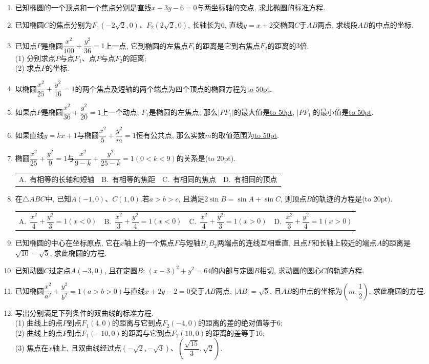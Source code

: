 \documentclass[10pt,a4paper]{article}
\newcommand{\blank}[1]{\underline{\hbox to #1pt{}}}
\newcommand{\bracket}[1]{(\hbox to #1pt{})}
\newcommand{\fourch}[4]{\par\begin{tabular}{p{.23\textwidth}p{.23\textwidth}p{.23\textwidth}p{.23\textwidth}}
A.~#1 &B.~#2& C.~#3& D.~#4
\end{tabular}}
\begin{document}
\begin{enumerate}[1.]
\item 已知椭圆的一个顶点和一个焦点分别是直线$x+3y-6=0$与两坐标轴的交点, 求此椭圆的标准方程.
\item 已知椭圆$C$的焦点分别为$F_1(-2\sqrt 2,0)$、$F_2(2\sqrt 2,0)$, 长轴长为$6$, 直线$y=x+2$交椭圆$C$于$AB$两点, 求线段$AB$的中点的坐标.
\item 已知点$P$是椭圆$\dfrac{x^2}{100}+\dfrac{y^2}{36}=1$上一点, 它到椭圆的左焦点$F_1$的距离是它到右焦点$F_2$的距离的$3$倍.\\
(1) 分别求点$P$与点$F_1$、点$P$与点$F_2$的距离;\\
(2) 求点$P$的坐标.
\item 以椭圆$\dfrac{x^2}{25}+\dfrac{y^2}{16}=1$的两个焦点及短轴的两个端点为四个顶点的椭圆方程为\blank{50}.
\item 如果点$P$是椭圆$\dfrac{x^2}{36}+\dfrac{y^2}{20}=1$上一个动点, $F_1$是椭圆的左焦点, 那么$|PF_1|$的最大值是\blank{50}, $|PF_1|$的最小值是\blank{50}.
\item 如果直线$y=kx+1$与椭圆$\dfrac{x^2}5+\dfrac{y^2}m=1$恒有公共点, 那么实数$m$的取值范围为\blank{50}.
\item 椭圆$\dfrac{x^2}{25}+\dfrac{y^2}9=1$与$\dfrac{x^2}{9-k}+\dfrac{y^2}{25-k}=1(0<k<9)$的关系是\bracket{20}.
\fourch{有相等的长轴和短轴}{有相等的焦距}{有相同的焦点}{有相同的顶点}
\item 在$\triangle ABC$中, 已知$A(-1,0)$、$C(1,0)$.若$a>b>c$, 且满足$2\sin B=\sin A+\sin C$, 则顶点$B$的轨迹的方程是\bracket{20}.
\fourch{$\dfrac{x^2}4+\dfrac{y^2}3=1(x<0)$}{$\dfrac{x^2}3+\dfrac{y^2}4=1(x<0)$}{$\dfrac{x^2}4+\dfrac{y^2}3=1(x>0)$}{$\dfrac{x^2}3+\dfrac{y^2}4=1(x>0)$}
\item 已知椭圆的中心在坐标原点, 它在$x$轴上的一个焦点$F$与短轴$B_1B_2$两端点的连线互相垂直, 且点$F$和长轴上较近的端点$A$的距离是$\sqrt {10}-\sqrt 5$, 求此椭圆的方程.
\item 已知动圆$C$过定点$A(-3,0)$, 且在定圆$B$: $(x-3)^2+y^2=64$的内部与定圆$B$相切, 求动圆的圆心$C$的轨迹方程.
\item 已知椭圆$\dfrac{x^2}{a^2}+\dfrac{y^2}{b^2}=1(a>b>0)$与直线$x+2y-2=0$交于$AB$两点, $|AB|=\sqrt 5$, 且$AB$的中点的坐标为$(m,\dfrac 12)$, 求此椭圆的方程.
\item 写出分别满足下列条件的双曲线的标准方程.\\
(1) 曲线上的点$P$到点$F_1(4,0)$的距离与它到点$F_2(-4,0)$的距离的差的绝对值等于$6$;\\
(2) 曲线上的点$P$到点$F_1(-10,0)$的距离与它到点$F_2(10,0)$的距离的差等于$16$;\\
(3) 焦点在$x$轴上, 且双曲线经过点$(-\sqrt 2,-\sqrt 3)$、$(\dfrac{\sqrt {15}}3,\sqrt 2)$.

\end{enumerate}
\end{document}
